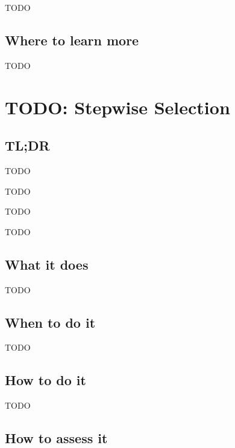 \documentclass[
]{book}
\providecommand{\tightlist}{%
  \setlength{\itemsep}{0pt}\setlength{\parskip}{0pt}}
\begin{document}
TODO

\hypertarget{where-to-learn-more-11}{%
\section{Where to learn more}\label{where-to-learn-more-11}}

TODO

\hypertarget{stepwise-selection}{%
\chapter{TODO: Stepwise Selection}\label{stepwise-selection}}

\hypertarget{tldr-12}{%
\section{TL;DR}\label{tldr-12}}

\begin{description}
\tightlist
\item[What it does]
TODO
\item[When to do it]
TODO
\item[How to do it]
TODO
\item[How to assess it]
TODO
\end{description}

\hypertarget{what-it-does-12}{%
\section{What it does}\label{what-it-does-12}}

TODO

\hypertarget{when-to-do-it-12}{%
\section{When to do it}\label{when-to-do-it-12}}

TODO

\hypertarget{how-to-do-it-12}{%
\section{How to do it}\label{how-to-do-it-12}}

TODO

\hypertarget{how-to-assess-it-12}{%
\section{How to assess it}\label{how-to-assess-it-12}}
\end{document}

